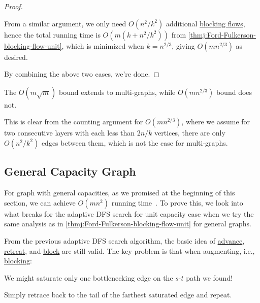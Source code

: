 \begin{proof}
\begin{explanation}
		From a similar argument, we only need \(O(n^2 / k^2)\) additional \hyperref[def:blocking-flow]{blocking flows}, hence the total running time is \(O(m (k + n^2 / k^2))\) from \autoref{thmj:Ford-Fulkerson-blocking-flow-unit}, which is minimized when \(k = n^{2 / 3}\), giving \(O(mn^{2 / 3})\) as desired.
	\end{explanation}

	By combining the above two cases, we're done.
\end{proof}

\begin{remark}
	The \(O(m \sqrt{m} )\) bound extends to multi-graphs, while \(O(mn^{2 / 3})\) bound does not.
\end{remark}
\begin{explanation}
	This is clear from the counting argument for \(O(mn^{2 / 3})\), where we assume for two consecutive layers with each less than \(2n / k\) vertices, there are only \(O(n^2 / k^2)\) edges between them, which is not the case for multi-graphs.
\end{explanation}

\subsection{General Capacity Graph}
For graph with general capacities, as we promised at the beginning of this section, we can achieve \(O(mn^2)\) running time~\cite{karzanov1973finding,dinic1970algorithm,goldberg1998beyond}. To prove this, we look into what breaks for the adaptive DFS search for unit capacity case when we try the same analysis as in \autoref{thmj:Ford-Fulkerson-blocking-flow-unit} for general graphs.

From the previous adaptive DFS search algorithm, the basic idea of \hyperref[algo:unit-adaptive-DFS-advance]{advance}, \hyperref[algo:unit-adaptive-DFS-retreat]{retreat}, and \hyperref[algo:unit-adaptive-DFS-block]{block} are still valid. The key problem is that when augmenting, i.e., \hyperref[algo:unit-adaptive-DFS-block]{blocking}:

\begin{problem*}
	We might saturate only one bottlenecking edge on the \(s\)-\(t\) path we found!
\end{problem*}
\begin{answer}
	Simply retrace back to the tail of the farthest saturated edge and repeat.
\end{answer}


